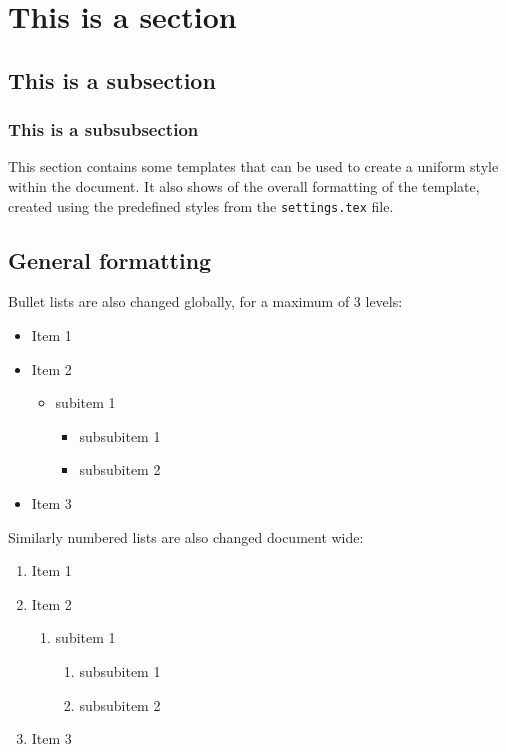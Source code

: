 \section{This is a section} 
\subsection{This is a subsection}

\subsubsection{This is a subsubsection}
This section contains some templates that can be used to create a uniform style within the document. It also shows of the overall formatting of the template, created using the predefined styles from the \texttt{settings.tex} file.

\subsection{General formatting}
Bullet lists are also changed globally, for a maximum of 3 levels:

\begin{itemize}
    \item Item 1
    \item Item 2
    \begin{itemize}
        \item subitem 1
        \begin{itemize}
            \item subsubitem 1
            \item subsubitem 2
        \end{itemize}
    \end{itemize}
    \item Item 3
\end{itemize}

Similarly numbered lists are also changed document wide:

\begin{enumerate}
    \item Item 1
    \item Item 2
    \begin{enumerate}
        \item subitem 1
        \begin{enumerate}
            \item subsubitem 1
            \item subsubitem 2
        \end{enumerate}
    \end{enumerate}
    \item Item 3
\end{enumerate}

